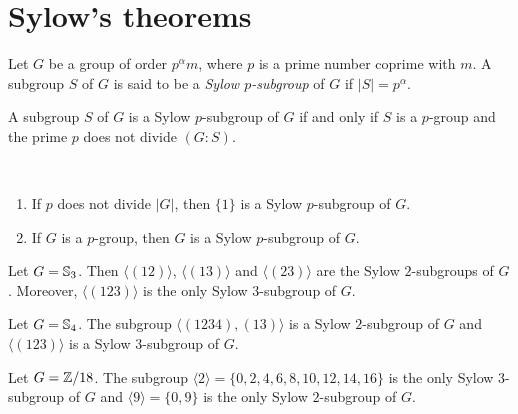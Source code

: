 \section{Sylow's theorems}
\lecture\label{lec:sylow}

\begin{definition}
Let $G$ be a group of order $p^\alpha m$, where $p$ is a prime number
coprime with $m$. A subgroup $S$ of $G$ is said to be a \emph{Sylow $p$-subgroup} of $G$ if $|S|=p^\alpha$.
\end{definition}

A subgroup $S$ of $G$ is a Sylow 
$p$-subgroup of $G$ if and only if $S$ is a $p$-group and
the prime $p$ does not divide $(G:S)$.

\begin{example}\
\begin{enumerate}
\item If $p$ does not divide $|G|$, then $\{1\}$ is a 
Sylow $p$-subgroup of $G$.
\item If $G$ is a $p$-group, then $G$ is a Sylow
$p$-subgroup of $G$.
\end{enumerate}
\end{example}

\begin{example}
Let $G=\mathbb{S}_3$. Then $\langle (12)\rangle$, $\langle (13)\rangle$ and $\langle (23)\rangle$ are the Sylow $2$-subgroups of $G$. Moreover, 
$\langle (123)\rangle$ is the only Sylow $3$-subgroup of $G$.
\end{example}

\begin{example}
Let $G=\mathbb{S}_4$. The subgroup $\langle (1234),(13)\rangle$ is a Sylow $2$-subgroup of $G$ and 
$\langle (123)\rangle$ is a Sylow $3$-subgroup of $G$.
\end{example}

\begin{example}
Let $G=\mathbb{Z}/18$. The subgroup 
$\langle 2\rangle =\{0,2,4,6,8,10,12,14,16\}$ is the only Sylow $3$-subgroup of $G$ and $\langle 9\rangle=\{0,9\}$ is the only
Sylow $2$-subgroup of $G$.
\end{example}

